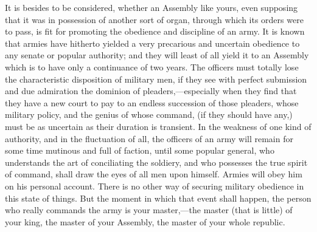 It is besides to be considered, whether an Assembly like yours, even supposing that it was in possession of another sort of organ, through which its orders were to pass, is fit for promoting the obedience and discipline of an army. It is known that armies have hitherto yielded a very precarious and uncertain obedience to any senate or popular authority; and they will least of all yield it to an Assembly which is to have only a continuance of two years. The officers must totally lose the characteristic disposition of military men, if they see with perfect submission and due admiration the dominion of pleaders,—especially when they find that they have a new court to pay to an endless succession of those pleaders, whose military policy, and the genius of whose command, (if they should have any,) must be as uncertain as their duration is transient. In the weakness of one kind of authority, and in the fluctuation of all, the officers of an army will remain for some time mutinous and full of faction, until some popular general, who understands the art of conciliating the soldiery, and who possesses the true spirit of command, shall draw the eyes of all men upon himself. Armies will obey him on his personal account. There is no other way of securing military obedience in this state of things. But the moment in which that event shall happen, the person who really commands the army is your master,—the master (that is little) of your king, the master of your Assembly, the master of your whole republic.


